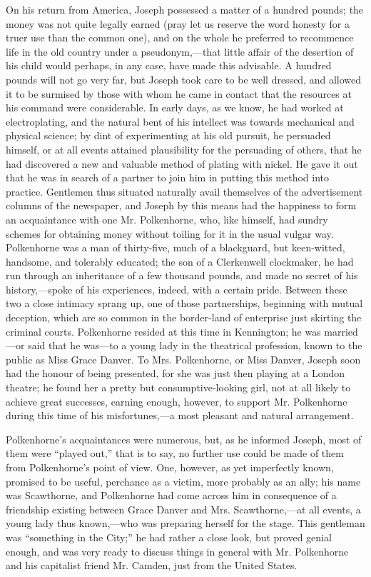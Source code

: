 On his return from America, Joseph possessed a matter of a hundred
pounds; the money was not quite legally earned (pray let us reserve the
word honesty for a truer use than the common one), and on the whole he
preferred to recommence life in the old country under a
pseudonym,---that little affair {\protect\hypertarget{177}{}{}}of the
desertion of his child would perhaps, in any case, have made this
advisable. A hundred pounds will not go very far, but Joseph took care
to be well dressed, and allowed it to be surmised by those with whom he
came in contact that the resources at his command were considerable. In
early days, as we know, he had worked at electroplating, and the natural
bent of his intellect was towards mechanical and physical science; by
dint of experimenting at his old pursuit, he persuaded himself, or at
all events attained plausibility for the persuading of others, that he
had discovered a new and valuable method of plating with nickel. He gave
it out that he was in search of a partner to join him in putting this
method into practice. Gentlemen thus situated naturally avail themselves
of the advertisement columns of the newspaper, and Joseph by this means
had the happiness to form an acquaintance with one Mr. Polkenhorne, who,
like himself, had sundry schemes for obtaining money without toiling for
it in the usual vulgar way. {\protect\hypertarget{178}{}{}}Polkenhorne
was a man of thirty-five, much of a blackguard, but keen-witted,
handsome, and tolerably educated; the son of a Clerkenwell clockmaker,
he had run through an inheritance of a few thousand pounds, and made no
secret of his history,---spoke of his experiences, indeed, with a
certain pride. Between these two a close intimacy sprang up, one of
those partnerships, beginning with mutual deception, which are so common
in the border-land of enterprise just skirting the criminal courts.
Polkenhorne resided at this time in Kennington; he was married---or said
that he was---to a young lady in the theatrical profession, known to the
public as Miss Grace Danver. To Mrs. Polkenhorne, or Miss Danver, Joseph
soon had the honour of being presented, for she was just then playing at
a London theatre; he found her a pretty but consumptive-looking girl,
not at all likely to achieve great successes, earning enough, however,
to support Mr. Polkenhorne during this time of his misfortunes,---a most
pleasant and natural arrangement.

{\protect\hypertarget{179}{}{}}Polkenhorne's acquaintances were
numerous, but, as he informed Joseph, most of them were ``played out,''
that is to say, no further use could be made of them from Polkenhorne's
point of view. One, however, as yet imperfectly known, promised to be
useful, perchance as a victim, more probably as an ally; his name was
Scawthorne, and Polkenhorne had come across him in consequence of a
friendship existing between Grace Danver and Mrs. Scawthorne,---at all
events, a young lady thus known,---who was preparing herself for the
stage. This gentleman was ``something in the City;'' he had rather a
close look, but proved genial enough, and was very ready to discuss
things in general with Mr. Polkenhorne and his capitalist friend Mr.
Camden, just from the United States.

